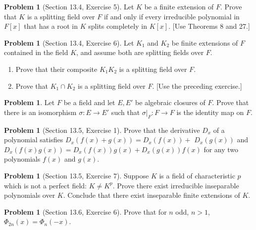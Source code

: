 \documentclass{amsart}
\numberwithin{equation}{section}
\theoremstyle{definition}
\newtheorem{problem}[thm]{Problem}
\begin{document}
\begin{problem}[Section 13.4, Exercise 5]
  Let \(K\) be a finite extension of \(F\). Prove that \(K\) is a
  splitting field over \(F\) if and only if every irreducible
  polynomial in \(F[x]\) that has a root in \(K\) splits completely in
  \(K[x]\). [Use Theorems 8 and 27.]
\end{problem}


\begin{problem}[Section 13.4, Exercise 6]
Let \(K_1\) and \(K_2\) be finite extensions of \(F\) contained in the field \(K\), and assume both are splitting fields over \(F\).
\begin{enumerate}
\item Prove that their composite \(K_1 K_2\) is a splitting field over \(F\).
\item Prove that \(K_1 \cap K_2\) is a splitting field over \(F\). [Use the preceding exercise.]
\end{enumerate}
\end{problem}



\begin{problem}
  Let \( F \) be a field and let \( E,E' \) be algebraic closures of
  \( F \). Prove that there is an isomorphism \( \sigma:E\to E' \)
  such that \( \sigma|_F:F\to F \) is the identity map on \( F \).
\end{problem}


\begin{problem}[Section 13.5, Exercise 1]
  Prove that the derivative \(D_x\) of a polynomial satisfies \(D_x(f(x)+g(x))=D_x(f(x))+\) \(D_x(g(x))\) and \(D_x(f(x) g(x))=D_x(f(x)) g(x)+D_x(g(x)) f(x)\) for any two polynomials \(f(x)\) and \(g(x)\).
\end{problem}


\begin{problem}[Section 13.5, Exercise 7]
Suppose \(K\) is a field of characteristic \(p\) which is not a perfect field: \(K \neq K^p\). Prove there exist irreducible inseparable polynomials over \(K\). Conclude that there exist inseparable finite extensions of \(K\).
\end{problem}


\begin{problem}[Section 13.6, Exercise 6]
  Prove that for \( n \) odd, \( n>1 \),
  \( \Phi_{2 n}(x)=\Phi_n(-x) \).
\end{problem}
\end{document}
